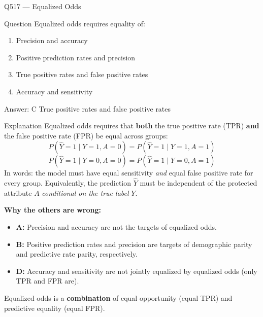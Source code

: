 \documentclass[aspectratio=169,8pt]{beamer}
\begin{document}
\begin{frame}{Q517 --- Equalized Odds}
	\begin{block}{Question}
		Equalized odds requires equality of:
		\begin{enumerate}
			\item Precision and accuracy
			\item Positive prediction rates and precision
			\item True positive rates and false positive rates
			\item Accuracy and sensitivity
		\end{enumerate}
	\end{block}
	\begin{exampleblock}{Answer: C}
		True positive rates and false positive rates
	\end{exampleblock}
	\begin{block}{Explanation}
		Equalized odds requires that \textbf{both} the true positive rate (TPR)
		\textbf{and} the false positive rate (FPR) be equal across groups:
		\[
		P(\hat{Y} = 1 \mid Y = 1, A = 0) = P(\hat{Y} = 1 \mid Y = 1, A = 1)
		\]
		\[
		P(\hat{Y} = 1 \mid Y = 0, A = 0) = P(\hat{Y} = 1 \mid Y = 0, A = 1)
		\]
		In words: the model must have equal sensitivity \emph{and} equal
		false positive rate for every group. Equivalently, the prediction
		\(\hat{Y}\) must be independent of the protected attribute \(A\)
		\emph{conditional on the true label} \(Y\).
		
		\textbf{Why the others are wrong:}
		\begin{itemize}
			\item \textbf{A:} Precision and accuracy are not the targets of equalized odds.
			\item \textbf{B:} Positive prediction rates and precision are targets of
			demographic parity and predictive rate parity, respectively.
			\item \textbf{D:} Accuracy and sensitivity are not jointly equalized by
			equalized odds (only TPR and FPR are).
		\end{itemize}
		Equalized odds is a \textbf{combination} of equal opportunity (equal TPR)
		and predictive equality (equal FPR).
	\end{block}
\end{frame}
\end{document}
